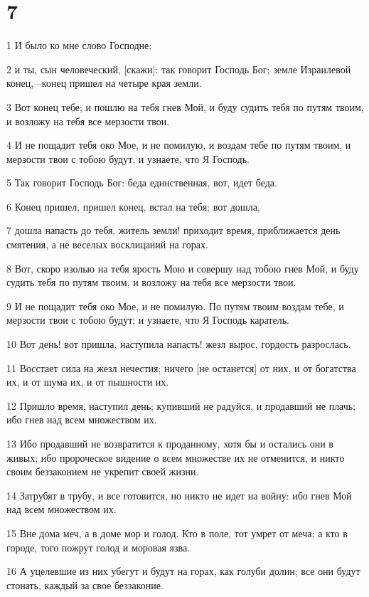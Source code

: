 \chapter{7}

\par 1 И было ко мне слово Господне:
\par 2 и ты, сын человеческий, [скажи]: так говорит Господь Бог; земле Израилевой конец, --конец пришел на четыре края земли.
\par 3 Вот конец тебе; и пошлю на тебя гнев Мой, и буду судить тебя по путям твоим, и возложу на тебя все мерзости твои.
\par 4 И не пощадит тебя око Мое, и не помилую, и воздам тебе по путям твоим, и мерзости твои с тобою будут, и узнаете, что Я Господь.
\par 5 Так говорит Господь Бог: беда единственная, вот, идет беда.
\par 6 Конец пришел, пришел конец, встал на тебя; вот дошла,
\par 7 дошла напасть до тебя, житель земли! приходит время, приближается день смятения, а не веселых восклицаний на горах.
\par 8 Вот, скоро изолью на тебя ярость Мою и совершу над тобою гнев Мой, и буду судить тебя по путям твоим, и возложу на тебя все мерзости твои.
\par 9 И не пощадит тебя око Мое, и не помилую. По путям твоим воздам тебе, и мерзости твои с тобою будут; и узнаете, что Я Господь каратель.
\par 10 Вот день! вот пришла, наступила напасть! жезл вырос, гордость разрослась.
\par 11 Восстает сила на жезл нечестия; ничего [не останется] от них, и от богатства их, и от шума их, и от пышности их.
\par 12 Пришло время, наступил день; купивший не радуйся, и продавший не плачь; ибо гнев над всем множеством их.
\par 13 Ибо продавший не возвратится к проданному, хотя бы и остались они в живых; ибо пророческое видение о всем множестве их не отменится, и никто своим беззаконием не укрепит своей жизни.
\par 14 Затрубят в трубу, и все готовится, но никто не идет на войну: ибо гнев Мой над всем множеством их.
\par 15 Вне дома меч, а в доме мор и голод. Кто в поле, тот умрет от меча; а кто в городе, того пожрут голод и моровая язва.
\par 16 А уцелевшие из них убегут и будут на горах, как голуби долин; все они будут стонать, каждый за свое беззаконие.

